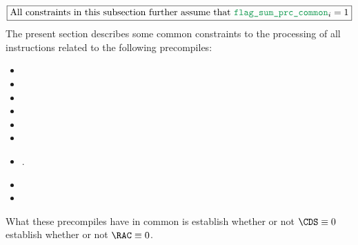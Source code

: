 \[
	\boxed{\text{All constraints in this subsection further assume that }
	\locPrcFlagSumCommon_{i} = 1
	}
\]
The present section describes some common constraints to the processing of all \oobMod{} instructions related to the following precompiles:
\begin{multicols}{3}
	\begin{itemize}
		\item {}
		\item{}
		\item{}
		\item{}
		\item{}
		\item{}
		\item{}.
		\item[\vspace{\fill}]
		\item[\vspace{\fill}]
	\end{itemize}
\end{multicols}
\noindent What these precompiles have in common is
 establish whether or not $\CDS \equiv 0$
 establish whether or not $\RAC \equiv 0$.

